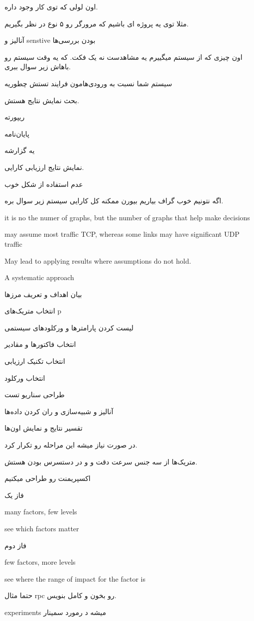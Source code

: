 اون لولی که توی کار وجود داره.

مثلا توی یه پروژه ای باشیم که مرورگر رو ۵ نوع در نظر بگیریم.

آنالیز و senstive بودن بررسی‌ها

اون چیزی که از سیستم میگییرم یه مشاهدست نه یک فکت. که یه وقت سیستم رو باهاش زیر سوال ببری.

سیستم شما نسبت به ورودی‌هامون فرایند تستش چطوریه

بحث نمایش نتایج هستش.

ریپورته

پایان‌نامه

یه گزارشه

نمایش نتایج ارزیابی کارایی.

عدم استفاده از شکل خوب

اگه نتونیم خوب گراف بیاریم بیورن ممکنه کل کارایی سیستم زیر سوال بره.

it is no the numer of graphs, but the number of graphs that help make decisions

may assume most traffic TCP, whereas some links may have significant UDP traffic

May lead to applying results where assumptions do not hold.

A systematic approach

بیان اهداف و تعریف مرز‌ها

انتخاب متریک‌های p 

لیست کردن پارامتر‌ها و ورکلود‌های سیستمی

انتخاب فاکتور‌ها و مقادیر

انتخاب تکنیک ارزیابی

انتخاب ورکلود

طراحی سناریو تست

آنالیز و شبیه‌سازی و ران کردن داده‌ها

تقسیر نتایج و نمایش اون‌ها

در صورت نیاز میشه این مراحله رو تکرار کرد.


متریک‌ها از سه جنس سرعت دقت و و در دستسرس بودن هستش.

اکسپریمنت رو طراحی میکنیم

فاز یک

many factors, few levels

see which factors matter

فاز دوم

few factors, more levels

see where the range of impact for the factor is

حتما مثال rpc رو بخون و کامل بنویس.

experiments میشه د رمورد سمینار


